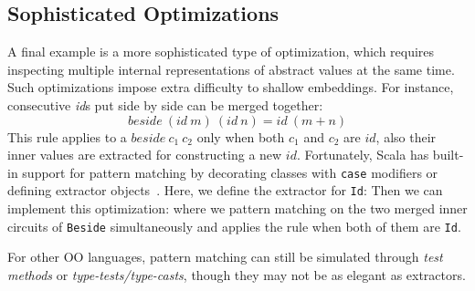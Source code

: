 \subsection{Sophisticated Optimizations}
A final example is a more sophisticated type of optimization, 
which requires inspecting multiple internal
representations of abstract values at the same time.
Such optimizations impose extra difficulty to shallow
embeddings.
For instance, consecutive \emph{id}s put side by side can be merged together:
$$
beside\ (id\ m)\ (id\ n) = id\ (m + n)
$$
This rule applies to a $beside\ c_1\ c_2$ only when both $c_1$ and $c_2$ are
$id$, also their inner values are extracted for constructing a new $id$.
Fortunately, Scala has built-in support for pattern matching by decorating
classes with \lstinline{case} modifiers or defining extractor objects~\cite{emir2007matching}.
Here, we define the extractor for \lstinline{Id}:
Then we can implement this optimization:
where we pattern matching on the two merged inner circuits of \lstinline{Beside}
simultaneously and applies the rule when both of them are \lstinline{Id}.

For other OO languages, pattern matching can still be simulated through \emph{test methods} or \emph{type-tests/type-casts},
though they may not be as elegant as extractors.

